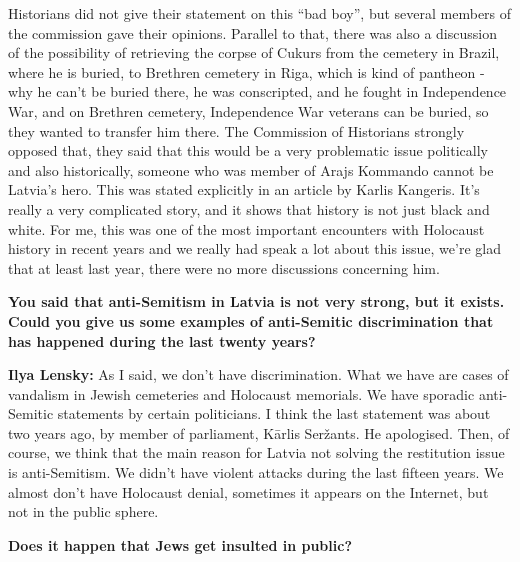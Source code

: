 Historians did not give their  statement on this ``bad boy'', but several members of the commission gave their opinions. Parallel to that, there was also a discussion of the possibility of retrieving the corpse of Cukurs from the cemetery in Brazil, where he is buried, to Brethren cemetery in Riga, which is kind of pantheon - why he can't be buried there, he was conscripted, and he fought in Independence War,  and on Brethren cemetery, Independence War veterans can be buried, so they wanted to transfer him there. The Commission of Historians strongly opposed that, they said that this would be a very problematic issue politically and also historically, someone who was member of Arajs Kommando cannot be Latvia's hero. This was stated explicitly in an article by Karlis Kangeris. It's really a very complicated story, and it shows that history is not just black and white. For me, this was one of the most important encounters with Holocaust history in recent years and we really had speak a lot about this issue, we’re glad that at least last year, there were no more discussions concerning him. 

\textbf{You said that anti-Semitism in Latvia is not very strong, but it exists. Could you give us some examples of anti-Semitic discrimination that has happened during the last twenty years?} 

\textbf{Ilya Lensky:} As I said, we don’t have discrimination. What we have are cases of vandalism in Jewish cemeteries and Holocaust memorials. We have sporadic anti-Semitic statements by certain politicians. I think the last statement was about two years ago, by member of parliament, Kārlis Seržants. He apologised. Then, of course, we think that the main reason for Latvia not solving the restitution issue is anti-Semitism. We didn't have violent attacks during the last fifteen years. We almost don’t have Holocaust denial, sometimes it appears on the Internet, but not in the public sphere.

\textbf{Does it happen that Jews get insulted in public?} 

